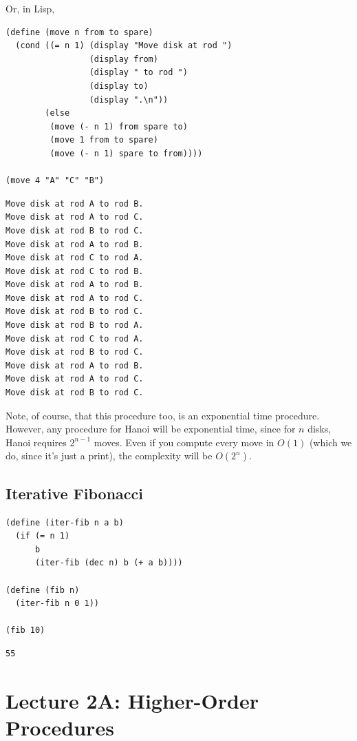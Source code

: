 \documentclass[9pt]{report}
\begin{document}
Or, in Lisp,

\begin{verbatim}
(define (move n from to spare)
  (cond ((= n 1) (display "Move disk at rod ")
                 (display from)
                 (display " to rod ")
                 (display to)
                 (display ".\n"))
        (else
         (move (- n 1) from spare to)
         (move 1 from to spare)
         (move (- n 1) spare to from))))

(move 4 "A" "C" "B")
\end{verbatim}

\begin{verbatim}
Move disk at rod A to rod B.
Move disk at rod A to rod C.
Move disk at rod B to rod C.
Move disk at rod A to rod B.
Move disk at rod C to rod A.
Move disk at rod C to rod B.
Move disk at rod A to rod B.
Move disk at rod A to rod C.
Move disk at rod B to rod C.
Move disk at rod B to rod A.
Move disk at rod C to rod A.
Move disk at rod B to rod C.
Move disk at rod A to rod B.
Move disk at rod A to rod C.
Move disk at rod B to rod C.
\end{verbatim}

Note, of course, that this procedure too, is an exponential time
procedure. However, any procedure for Hanoi will be exponential
time, since for \(n\) disks, Hanoi requires \(2^{n-1}\) moves. Even if
you compute every move in \(O(1)\) (which we do, since it's just a
print), the complexity will be \(O(2^n)\).

\section{Iterative Fibonacci}
\label{sec:orga092435}

\begin{verbatim}
(define (iter-fib n a b)
  (if (= n 1)
      b
      (iter-fib (dec n) b (+ a b))))

(define (fib n)
  (iter-fib n 0 1))

(fib 10)
\end{verbatim}

\begin{verbatim}
55
\end{verbatim}

\chapter{Lecture 2A: Higher-Order Procedures}
\label{sec:org16a1d36}
\end{document}
